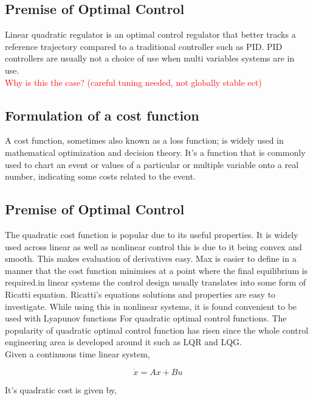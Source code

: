 \documentclass{UoNMCHA}
\numberwithin{equation}{section}
\begin{document}
\subsection*{Premise of Optimal Control}

Linear quadratic regulator is an optimal control regulator that better tracks a reference trajectory compared to a traditional controller such as PID. PID controllers are usually not a choice of use when multi variables systems are in use. \\
\textcolor{red}{Why is this the case? (careful tuning needed, not globally stable ect)} 

\subsection*{Formulation of a cost function }

A cost function, sometimes also known as a loss function; is widely used in mathematical optimization and decision theory. It’s a function that is commonly used to chart an event or values of a particular or multiple variable onto a real number, indicating some costs related to the event.

\subsection*{Premise of Optimal Control}

The quadratic cost function is popular due to its useful properties. It is widely used across linear as well as nonlinear control this is due to it being convex and smooth. This makes evaluation of derivatives easy. Max is easier to define in a manner that the cost function minimises at a point where the final equilibrium is required.in linear systems the control design usually translates into some form of Ricatti equation. Ricatti's equations solutions and properties are easy to investigate. While using this in nonlinear systems, it is found convenient to be used with Lyapunov functions For quadratic optimal control functions. The popularity of quadratic optimal control function has risen since the whole control engineering area is developed around it such as LQR and LQG. \\

Given a continuous time linear system,

\begin{equation}
	\dot{x} = Ax + Bu
\end{equation}

It's quadratic cost is given by,
\end{document}
